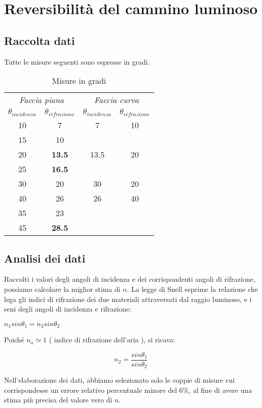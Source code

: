 \section{Reversibilità del cammino luminoso}
\subsection{Raccolta dati}
Tutte le misure seguenti sono espresse in gradi.


\begin{table}
\center
\begin{tabular}{c|c||c|c}
 \multicolumn{2}{c}{\textit{Faccia piana}} &
\multicolumn{2}{c}{\textit{Faccia curva}} \\
$\theta_{incidenza} $ & $\theta_{rifrazione} $ &$\theta_{incidenza} $ & $\theta_{rifrazione} $\\
\midrule
 10 & 7 & 7 & 10 \\
15 & 10 & &\\
20 & \textbf{13.5} & 13.5 & 20\\ 
25 & \textbf{16.5} & & \\
30 & 20 & 30 & 20\\
40 & 26 & 26 & 40\\
35 & 23 & &\\
45&  \textbf{28.5} & & \\
\end{tabular}
\caption*{Misure in gradi}
\end{table}

\subsection{Analisi dei dati}
Raccolti i valori degli angoli di incidenza e dei corrispondenti angoli di rifrazione, possiamo calcolare la miglior stima di $n$.
La legge di Snell esprime la relazione che lega gli indici di rifrazione dei due materiali attraversati dal raggio luminoso, e i seni degli angoli di incidenza e rifrazione:

\begin{center}
$n_1 sin\theta_1 = n_2 sin\theta_2$
\end{center}

Poiché $n_a \simeq1 $ ( indice di rifrazione dell'aria ), si ricava:

$$n_2 = \frac{sin\theta_1}{sin\theta_2}$$

Nell'elaborazione dei dati, abbiamo selezionato solo le coppie di misure cui corrispondesse un errore relativo percentuale minore del 6\%, al fine di avere una stima più precisa del valore vero di $n$.

